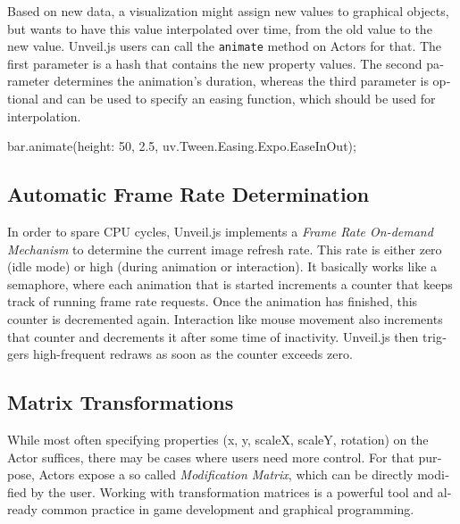 \begin{english}
Based on new data, a visualization might assign new values to graphical objects, but wants to have this value interpolated over time, from the old value to the new value. Unveil.js users can call the \texttt{animate} method on Actors for that. The first parameter is a hash that contains the new property values. The second parameter determines the animation's duration, whereas the third parameter is optional and can be used to specify an easing function, which should be used for interpolation.


\begin{program}
\begin{CppSourceCode}
bar.animate({height: 50}, 2.5, uv.Tween.Easing.Expo.EaseInOut);
\end{CppSourceCode}
\end{program}



\subsection{Automatic Frame Rate Determination}

In order to spare CPU cycles, Unveil.js implements a \emph{Frame Rate On-demand Mechanism} to determine the current image refresh rate. This rate is either zero (idle mode) or high (during animation or interaction). It basically works like a semaphore, where each animation that is started increments a counter that keeps track of running frame rate requests. Once the animation has finished, this counter is decremented again. Interaction like mouse movement also increments that counter and decrements it after some time of inactivity. Unveil.js then triggers high-frequent redraws as soon as the counter exceeds zero.

\subsection{Matrix Transformations}

While most often specifying properties (x, y, scaleX, scaleY, rotation) on the Actor suffices, there may be cases where users need more control. For that purpose, Actors expose a so called \emph{Modification Matrix}, which can be directly modified by the user. Working with transformation matrices is a powerful tool and already common practice in game development and graphical programming.


\end{english}
